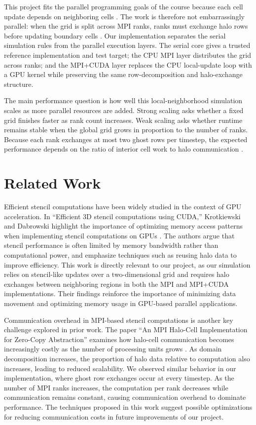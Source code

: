 \documentclass[10pt,twocolumn]{article}
\begin{document}
This project fits the parallel programming goals of the course because each cell update depends on neighboring cells \cite{stencil}. The work is therefore not embarrassingly parallel: when the grid is split across MPI ranks, ranks must exchange halo rows before updating boundary cells \cite{halo}. Our implementation separates the serial simulation rules from the parallel execution layers. The serial core gives a trusted reference implementation and test target; the CPU MPI layer distributes the grid across ranks; and the MPI+CUDA layer replaces the CPU local-update loop with a GPU kernel while preserving the same row-decomposition and halo-exchange structure.

The main performance question is how well this local-neighborhood simulation scales as more parallel resources are added. Strong scaling asks whether a fixed grid finishes faster as rank count increases. Weak scaling asks whether runtime remains stable when the global grid grows in proportion to the number of ranks. Because each rank exchanges at most two ghost rows per timestep, the expected performance depends on the ratio of interior cell work to halo communication \cite{llnlmpi}.

\section*{Related Work}

Efficient stencil computations have been widely studied in the context of GPU acceleration. In ``Efficient 3D stencil computations using CUDA,'' Krotkiewski and Dabrowski highlight the importance of optimizing memory access patterns when implementing stencil computations on GPUs \cite{stencilpaper}. The authors argue that stencil performance is often limited by memory bandwidth rather than computational power, and emphasize techniques such as reusing halo data to improve efficiency. This work is directly relevant to our project, as our simulation relies on stencil-like updates over a two-dimensional grid and requires halo exchanges between neighboring regions in both the MPI and MPI+CUDA implementations. Their findings reinforce the importance of minimizing data movement and optimizing memory usage in GPU-based parallel applications.

Communication overhead in MPI-based stencil computations is another key challenge explored in prior work. The paper ``An MPI Halo-Cell Implementation for Zero-Copy Abstraction'' examines how halo-cell communication becomes increasingly costly as the number of processing units grows \cite{halocell}. As domain decomposition increases, the proportion of halo data relative to computation also increases, leading to reduced scalability. We observed similar behavior in our implementation, where ghost row exchanges occur at every timestep. As the number of MPI ranks increases, the computation per rank decreases while communication remains constant, causing communication overhead to dominate performance. The techniques proposed in this work suggest possible optimizations for reducing communication costs in future improvements of our project.
\end{document}
